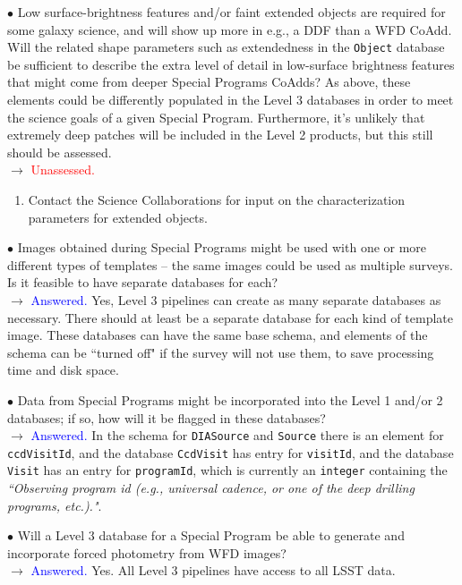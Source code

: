 \documentclass[DM,lsstdraft,toc]{lsstdoc}
\begin{document}
$\bullet$ Low surface-brightness features and/or faint extended objects are required for some galaxy science, and will show up more in e.g., a DDF than a WFD CoAdd. Will the related shape parameters such as extendedness in the {\tt Object} database be sufficient to describe the extra level of detail in low-surface brightness features that might come from deeper Special Programs CoAdds? As above, these elements could be differently populated in the Level 3 databases in order to meet the science goals of a given Special Program. Furthermore, it's unlikely that extremely deep patches will be included in the Level 2 products, but this still should be assessed.\\
$\rightarrow$ \textcolor{red}{Unassessed.}
\begin{enumerate}[resume,topsep=-10pt,label= \textbf{Action \Roman*.}] \item Contact the Science Collaborations for input on the characterization parameters for extended objects. \end{enumerate}

$\bullet$ Images obtained during Special Programs might be used with one or more different types of templates -- the same images could be used as multiple surveys. Is it feasible to have separate databases for each? \\ 
$\rightarrow$ \textcolor{blue}{Answered.} Yes, Level 3 pipelines can create as many separate databases as necessary. There should at least be a separate database for each kind of template image. These databases can have the same base schema, and elements of the schema can be ``turned off" if the survey will not use them, to save processing time and disk space. 

$\bullet$ Data from Special Programs might be incorporated into the Level 1 and/or 2 databases; if so, how will it be flagged in these databases? \\
$\rightarrow$  \textcolor{blue}{Answered.} In the schema for {\tt DIASource} and {\tt Source} there is an element for {\tt ccdVisitId}, and the database {\tt CcdVisit} has entry for {\tt visitId}, and the database {\tt Visit} has an entry for {\tt programId}, which is currently an {\tt integer} containing the {\it ``Observing program id (e.g., universal cadence, or one of the deep drilling programs, etc.)."}. 

$\bullet$ Will a Level 3 database for a Special Program be able to generate and incorporate forced photometry from WFD images? \\
$\rightarrow$ \textcolor{blue}{Answered.} Yes. All Level 3 pipelines have access to all LSST data.
\end{document}
